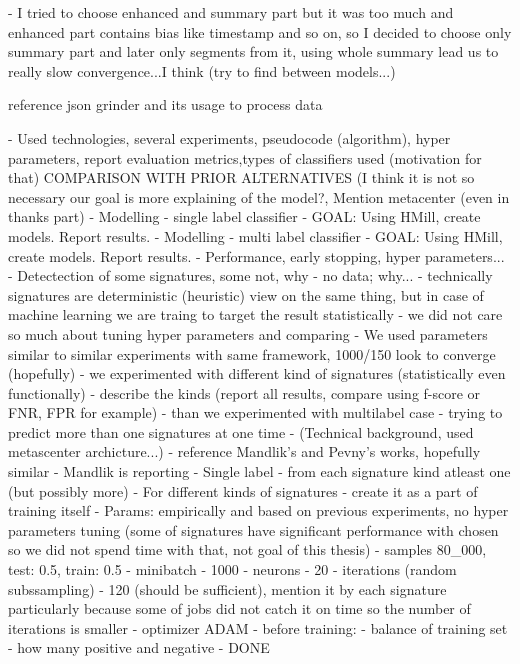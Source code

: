 - I tried to choose enhanced and summary part but it was too much and enhanced part contains bias like timestamp and so on, so I decided to choose only summary part and later only segments from it, using whole summary lead us to really slow convergence...I think (try to find between models...)

reference json grinder and its usage to process data

- Used technologies, several experiments, pseudocode (algorithm), hyper parameters, report evaluation metrics,types of classifiers used (motivation for that) COMPARISON WITH PRIOR ALTERNATIVES (I think it is not so necessary our goal is more explaining of the model?, Mention metacenter (even in thanks part)
  - Modelling - single label classifier
    - GOAL: Using HMill, create models. Report results.
  - Modelling - multi label classifier
    - GOAL: Using HMill, create models. Report results.
  - Performance, early stopping, hyper parameters...
  - Detectection of some signatures, some not, why - no data; why...
    - technically signatures are deterministic (heuristic) view on the same thing, but in case of machine learning we are traing to target the result statistically
    - we did not care so much about tuning hyper parameters and comparing
       - We used parameters similar to similar experiments with same framework, 1000/150 look to converge (hopefully)
       - we experimented with different kind of signatures (statistically even functionally) - describe the kinds (report all results, compare using f-score or FNR, FPR for example)
       - than we experimented with multilabel case - trying to predict more than one signatures at one time
  - (Technical background, used metascenter archicture...)
  - reference Mandlik's and Pevny's works, hopefully similar
    - Mandlik is reporting
      - Single label - from each signature kind atleast one (but possibly more) - For different kinds of signatures - create it as a part of training itself
        - Params: empirically and based on previous experiments, no hyper parameters tuning (some of signatures have significant performance with chosen so we did not spend time with that, not goal of this thesis)
            - samples 80_000, test: 0.5, train: 0.5
            - minibatch - 1000
            - neurons - 20
            - iterations (random subssampling) - 120 (should be sufficient), mention it by each signature particularly because some of jobs did not catch it on time so the number of iterations is smaller
            - optimizer ADAM
        - before training:
            - balance of training set - how many positive and negative - DONE
